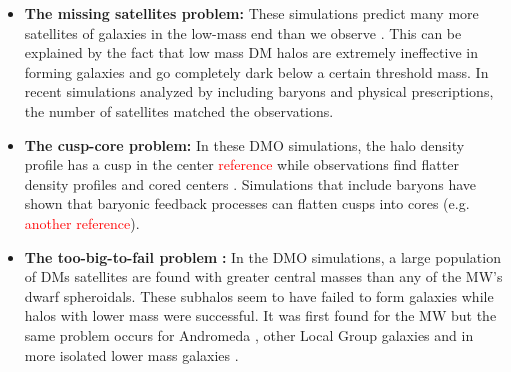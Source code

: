 \begin{itemize}
    \item\textbf{The missing satellites problem:} These simulations predict many more satellites of galaxies in the low-mass end than we observe \citep{Klypin...missingsatellites...1999, Moore...missingsatellites..1999}. This can be explained by the fact that low mass \ac{DM} halos are extremely ineffective in forming galaxies and go completely dark below a certain threshold mass. In recent simulations analyzed by \citet{Sawala...noCDMproblems...2016} including baryons and physical prescriptions, the number of satellites matched the observations.
    \item \textbf{The cusp-core problem:} In these \ac{DMO} simulations, the halo density profile has a cusp in the center \textcolor{red}{reference} while observations find flatter density profiles and cored centers \citep{Flores...cuspcoreprob...1994, Moore...cuspcoreprob...1994}. Simulations that include baryons have shown that baryonic feedback processes can flatten cusps into cores (e.g. \citealp{Pontzen...cuspcore..2012} \textcolor{red}{another reference}). 
    \item \textbf{The too-big-to-fail problem} \citep{Boylan...toobigtoofail...2011}\textbf{:} In the \ac{DMO} simulations, a large population of \acp{DM} satellites are found with greater central masses than any of the \ac{MW}'s dwarf spheroidals. These subhalos seem to have failed to form galaxies while halos with lower mass were successful. It was first found for the \ac{MW} but the same problem occurs for Andromeda \citep{Tollerud...M31tbtf...2014}, other Local Group galaxies \citep{Kirby...LGtbtf...2014} and in more isolated lower mass galaxies \citep{Ferrero...DGtbtf...2012, Papastergis...DGtbtf...2015, Papastergis...DGtbtf...2016}.

\end{itemize}

